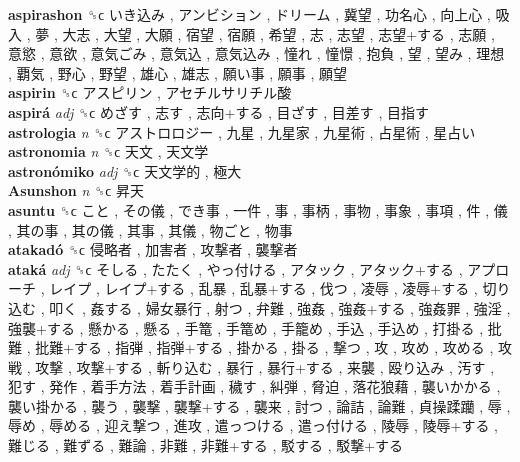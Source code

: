 \textbf{aspirashon} ␝ϲ   いき込み ,  アンビション ,  ドリーム ,  冀望 ,  功名心 ,  向上心 ,  吸入 ,  夢 ,  大志 ,  大望 ,  大願 ,  宿望 ,  宿願 ,  希望 ,  志 ,  志望 ,  志望+する ,  志願 ,  意慾 ,  意欲 ,  意気ごみ ,  意気込 ,  意気込み ,  憧れ ,  憧憬 ,  抱負 ,  望 ,  望み ,  理想 ,  覇気 ,  野心 ,  野望 ,  雄心 ,  雄志 ,  願い事 ,  願事 ,  願望   \\
\textbf{aspirin} ␝ϲ   アスピリン ,  アセチルサリチル酸   \\
\textbf{aspirá} \emph{adj}  ␝ϲ   めざす ,  志す ,  志向+する ,  目ざす ,  目差す ,  目指す   \\
\textbf{astrologia} \emph{n}  ␝ϲ   アストロロジー ,  九星 ,  九星家 ,  九星術 ,  占星術 ,  星占い   \\
\textbf{astronomia} \emph{n}  ␝ϲ   天文 ,  天文学   \\
\textbf{astronómiko} \emph{adj}  ␝ϲ   天文学的 ,  極大   \\
\textbf{Asunshon} \emph{n}  ␝ϲ   昇天   \\
\textbf{asuntu} ␝ϲ   こと ,  その儀 ,  でき事 ,  一件 ,  事 ,  事柄 ,  事物 ,  事象 ,  事項 ,  件 ,  儀 ,  其の事 ,  其の儀 ,  其事 ,  其儀 ,  物ごと ,  物事   \\
\textbf{atakadó} ␝ϲ   侵略者 ,  加害者 ,  攻撃者 ,  襲撃者   \\
\textbf{ataká} \emph{adj}  ␝ϲ   そしる ,  たたく ,  やっ付ける ,  アタック ,  アタック+する ,  アプローチ ,  レイプ ,  レイプ+する ,  乱暴 ,  乱暴+する ,  伐つ ,  凌辱 ,  凌辱+する ,  切り込む ,  叩く ,  姦する ,  婦女暴行 ,  射つ ,  弁難 ,  強姦 ,  強姦+する ,  強姦罪 ,  強淫 ,  強襲+する ,  懸かる ,  懸る ,  手篭 ,  手篭め ,  手籠め ,  手込 ,  手込め ,  打掛る ,  批難 ,  批難+する ,  指弾 ,  指弾+する ,  掛かる ,  掛る ,  撃つ ,  攻 ,  攻め ,  攻める ,  攻戦 ,  攻撃 ,  攻撃+する ,  斬り込む ,  暴行 ,  暴行+する ,  来襲 ,  殴り込み ,  汚す ,  犯す ,  発作 ,  着手方法 ,  着手計画 ,  穢す ,  糾弾 ,  脅迫 ,  落花狼藉 ,  襲いかかる ,  襲い掛かる ,  襲う ,  襲撃 ,  襲撃+する ,  襲来 ,  討つ ,  論詰 ,  論難 ,  貞操蹂躪 ,  辱 ,  辱め ,  辱める ,  迎え撃つ ,  進攻 ,  遣っつける ,  遣っ付ける ,  陵辱 ,  陵辱+する ,  難じる ,  難ずる ,  難論 ,  非難 ,  非難+する ,  駁する ,  駁撃+する   \\
